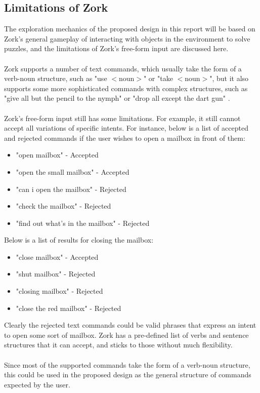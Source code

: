 \documentclass[11pt]{article}
\begin{document}
\subsection{Limitations of Zork}

The exploration mechanics of the proposed design in this report will be based on Zork's general gameplay of interacting with objects in the environment to solve puzzles, and the limitations of Zork's free-form input are discussed here.
\\
\\
Zork supports a number of text commands, which usually take the form of a verb-noun structure, such as "use $<$noun$>$" or "take $<$noun$>$", but it also supports some more sophisticated commands with complex structures, such as "give all but the pencil to the nymph" or "drop all except the dart gun" \cite{RefWorks:36}.
\\
\\
Zork's free-form input still has some limitations. For example, it still cannot accept all variations of specific intents. For instance, below is a list of accepted and rejected commands if the user wishes to open a mailbox in front of them:
\begin{itemize}
	\item "open mailbox" - Accepted
	\item "open the small mailbox" - Accepted
	\item "can i open the mailbox" - Rejected
	\item "check the mailbox" - Rejected
	\item "find out what's in the mailbox" - Rejected
\end{itemize}
Below is a list of results for closing the mailbox:
\begin{itemize}
	\item "close mailbox" - Accepted
	\item "shut mailbox" - Rejected
	\item "closing mailbox" - Rejected
	\item "close the red mailbox" - Rejected
\end{itemize}
Clearly the rejected text commands could be valid phrases that express an intent to open some sort of mailbox. Zork has a pre-defined list of verbs and sentence structures that it can accept, and sticks to those without much flexibility.
\\
\\
Since most of the supported commands take the form of a verb-noun structure, this could be used in the proposed design as the general structure of commands expected by the user.
\end{document}
